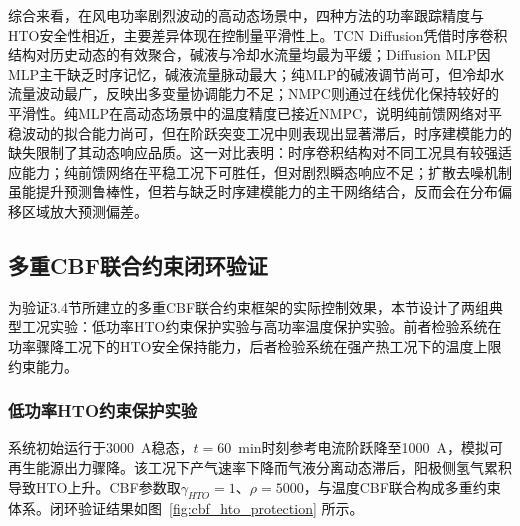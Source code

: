 
综合来看，在风电功率剧烈波动的高动态场景中，四种方法的功率跟踪精度与HTO安全性相近，主要差异体现在控制量平滑性上。TCN Diffusion凭借时序卷积结构对历史动态的有效聚合，碱液与冷却水流量均最为平缓；Diffusion MLP因MLP主干缺乏时序记忆，碱液流量脉动最大；纯MLP的碱液调节尚可，但冷却水流量波动最广，反映出多变量协调能力不足；NMPC则通过在线优化保持较好的平滑性。纯MLP在高动态场景中的温度精度已接近NMPC，说明纯前馈网络对平稳波动的拟合能力尚可，但在阶跃突变工况中则表现出显著滞后，时序建模能力的缺失限制了其动态响应品质。这一对比表明：时序卷积结构对不同工况具有较强适应能力；纯前馈网络在平稳工况下可胜任，但对剧烈瞬态响应不足；扩散去噪机制虽能提升预测鲁棒性，但若与缺乏时序建模能力的主干网络结合，反而会在分布偏移区域放大预测偏差。

\subsection{多重CBF联合约束闭环验证}

为验证3.4节所建立的多重CBF联合约束框架的实际控制效果，本节设计了两组典型工况实验：低功率HTO约束保护实验与高功率温度保护实验。前者检验系统在功率骤降工况下的HTO安全保持能力，后者检验系统在强产热工况下的温度上限约束能力。

\subsubsection{低功率HTO约束保护实验}

系统初始运行于3000~A稳态，$t=60$~min时刻参考电流阶跃降至1000~A，模拟可再生能源出力骤降。该工况下产气速率下降而气液分离动态滞后，阳极侧氢气累积导致HTO上升。CBF参数取$\gamma_{HTO}=1$、$\rho=5000$，与温度CBF联合构成多重约束体系。闭环验证结果如图~\ref{fig:cbf_hto_protection} 所示。


